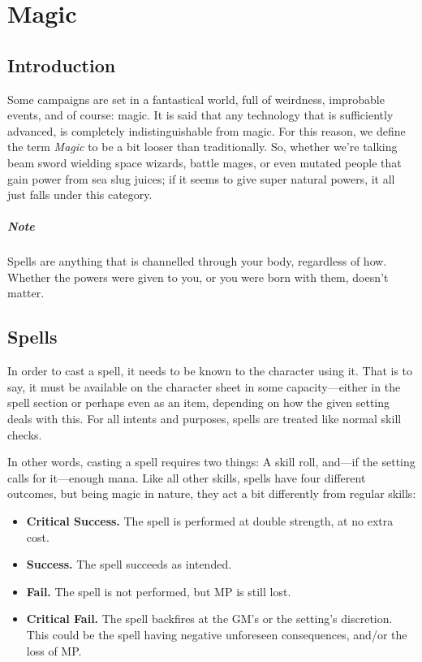 \chapter{Magic} \label{chap:magic}
\section{Introduction}
Some campaigns are set in a fantastical world, full of weirdness, improbable events, and of course: magic.
It is said that any technology that is sufficiently advanced, is completely indistinguishable from magic.
For this reason, we define the term \textit{Magic} to be a bit looser than traditionally.
So, whether we're talking beam sword wielding space wizards, battle mages, or even mutated people that gain power from sea slug juices;
if it seems to give super natural powers, it all just falls under this category.

\paragraph{Note} Spells are anything that is channelled through your body, regardless of how.
Whether the powers were given to you, or you were born with them, doesn't matter.

\section{Spells}
In order to cast a spell, it needs to be known to the character using it.
That is to say, it must be available on the character sheet in some capacity---either in the spell section or perhaps even as an item, depending on how the given setting deals with this.
For all intents and purposes, spells are treated like normal skill checks.

In other words, casting a spell requires two things: A skill roll, and---if the setting calls for it---enough mana.
Like all other skills, spells have four different outcomes, but being magic in nature, they act a bit differently from regular skills:
\begin{itemize}
  \item \textbf{Critical Success.} The spell is performed at double strength, at no extra cost.
  \item \textbf{Success.} The spell succeeds as intended.
  \item \textbf{Fail.} The spell is not performed, but MP is still lost.
  \item \textbf{Critical Fail.} The spell backfires at the GM's or the setting's discretion.
\\This could be the spell having negative unforeseen consequences, and/or the loss of MP.
\end{itemize}

